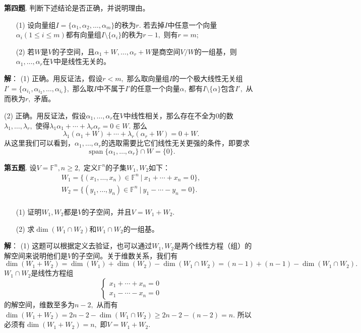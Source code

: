 \newpageorvspace

{\bf 第四题}. 判断下述结论是否正确，并说明理由。
\begin{itemize}
\item[(1)] 设向量组$I = \{ \alpha_1, \alpha_2, \ldots, \alpha_m \}$的秩为$r.$ 若去掉$I$中任意一个向量$\alpha_i (1 \leqslant i \leqslant m)$都有向量组$I \setminus \{ \alpha_i \}$的秩为$r-1,$ 则有$r = m$;
\item[(2)] 若$W$是$V$的子空间，且$\alpha_1 + W, \ldots, \alpha_r + W$是商空间$V / W$的一组基，则$\alpha_1, \ldots, \alpha_r$在$V$中是线性无关的。
\end{itemize}

\newpageorvspace

{\bf 解}： (1) 正确。用反证法，假设$r < m,$ 那么取向量组$I$的一个极大线性无关组$I' = \{ \alpha_{i_1}, \alpha_{i_2}, \ldots, \alpha_{i_r} \},$ 那么取$I$中不属于$I'$的任意一个向量$\alpha$, 都有$I \setminus \{ \alpha \}$包含$I',$ 从而秩为$r,$ 矛盾。

(2) 正确。用反证法，假设$\alpha_1, \ldots, \alpha_r$在$V$中线性相关，那么存在不全为0的数$\lambda_1, \ldots, \lambda_r,$ 使得$\lambda_1 \alpha_1 + \cdots + \lambda_r \alpha_r = 0 \in W.$ 那么
$$\lambda_1 (\alpha_1 + W) + \cdots + \lambda_r (\alpha_r + W) = 0 + W.$$
从这里我们可以看到，$\alpha_1, \ldots, \alpha_r$的选取需要比它们线性无关更强的条件，即要求
$$\operatorname{span}\{ \alpha_1, \ldots, \alpha_r \} \cap W = \{0\}.$$

\newpageorvspace

{\bf 第五题}. 设$V = \mathbb{F}^n, n \geqslant 2,$ 定义$\mathbb{F}^n$的子集$W_1, W_2$如下：
\begin{gather*}
W_1 = \{ (x_1, \ldots, x_n) \in \mathbb{F}^n \ |\ x_1 + \cdots + x_n = 0 \}, \\
W_2 = \{ (y_1, \ldots, y_n) \in \mathbb{F}^n \ |\ y_1 - \cdots - y_n = 0 \}. \\
\end{gather*}
\begin{itemize}
\item[(1)] 证明$W_1, W_2$都是$V$的子空间，并且$V = W_1 + W_2$.
\item[(2)] 求$\dim (W_1 \cap W_2)$和$W_1 \cap W_2$的一组基。
\end{itemize}

\newpageorvspace

{\bf 解}： (1) 这题可以根据定义去验证，也可以通过$W_1, W_2$是两个线性方程（组）的解空间来说明他们是$V$的子空间。关于维数关系，我们有
$$\dim (W_1 + W_2) = \dim(W_1) + \dim(W_2) - \dim(W_1 \cap W_2) = (n - 1) + (n - 1) - \dim(W_1 \cap W_2).$$
$W_1 \cap W_2$是线性方程组
$$
\begin{cases}
x_1 + \cdots + x_n = 0 \\
x_1 - \cdots - x_n = 0
\end{cases}
$$
的解空间，维数至多为$n-2,$ 从而有$\dim (W_1 + W_2) = 2n - 2 - \dim(W_1 \cap W_2) \geqslant 2n - 2 - (n - 2) = n$. 所以必须有$\dim (W_1 + W_2) = n,$ 即$V = W_1 + W_2$.

